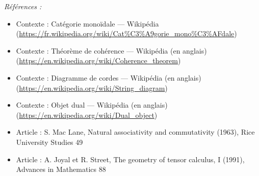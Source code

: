 \documentclass[11pt]{article}
\newenvironment{refs}{\par\small\noindent\emph{Références :}\begin{itemize}\setlength\itemsep{0pt}}{\end{itemize}\normalsize}
\begin{document}
\begin{refs}
\item Contexte : Catégorie monoïdale --- Wikipédia (\url{https://fr.wikipedia.org/wiki/Cat%C3%A9gorie_mono%C3%AFdale})
\item Contexte : Théorème de cohérence --- Wikipédia (en anglais) (\url{https://en.wikipedia.org/wiki/Coherence_theorem})
\item Contexte : Diagramme de cordes --- Wikipédia (en anglais) (\url{https://en.wikipedia.org/wiki/String_diagram})
\item Contexte : Objet dual --- Wikipédia (en anglais) (\url{https://en.wikipedia.org/wiki/Dual_object})
\item Article : S. Mac Lane, \og{} Natural associativity and commutativity \fg{} (1963), Rice University Studies 49
\item Article : A. Joyal et R. Street, \og{} The geometry of tensor calculus, I \fg{} (1991), Advances in Mathematics 88
\end{refs}

\bigskip
\end{document}
